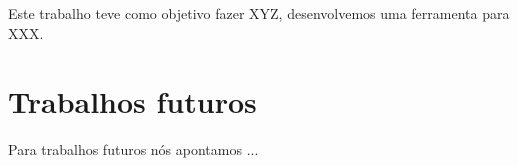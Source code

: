 \label{conclusao}

Este trabalho teve como objetivo fazer XYZ, desenvolvemos uma ferramenta para XXX.

\section{Trabalhos futuros}
Para trabalhos futuros nós apontamos ...